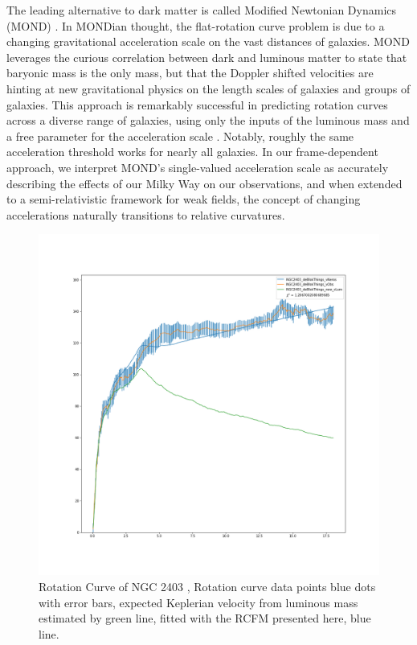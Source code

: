 \documentclass[reprint,%
 amsmath,amssymb,
 aps,
]{revtex4-1}
\begin{document}
  The leading   alternative to dark matter    is called Modified Newtonian Dynamics (MOND) \cite{Milgrom}.  In MONDian thought, the flat-rotation curve problem is due to a changing gravitational acceleration scale on the vast distances of galaxies.  
 MOND leverages the curious correlation between dark and luminous matter \cite{McGaugh_2014} to state that baryonic mass is the only mass, but that the Doppler shifted velocities  are hinting at new gravitational physics on the length scales of galaxies and groups of galaxies.  This approach  is remarkably successful in predicting  rotation curves  across a diverse range  of galaxies,   using only the inputs of the luminous mass and a free parameter for the   acceleration scale \cite{McGaugh2016RAR}. 
 Notably, roughly the same acceleration threshold works for nearly all galaxies. In our frame-dependent approach, we interpret   MOND's single-valued acceleration scale as accurately describing the effects of our Milky Way on our observations, and when extended to a semi-relativistic framework for weak fields, the concept of changing accelerations naturally transitions to relative curvatures. 
 
    
 \begin{figure}[h!]
      \centering
      \includegraphics[width=\linewidth]{NGC2403_deBlokThings_XueSofue}
      \caption{Rotation Curve of NGC 2403 \cite{Blok1},  Rotation curve data points blue dots with  error bars, expected Keplerian velocity from luminous mass estimated by   green line, fitted with the RCFM presented here, blue line. }
      \label{fig:NGC2403}
  \end{figure}
  
\end{document}
